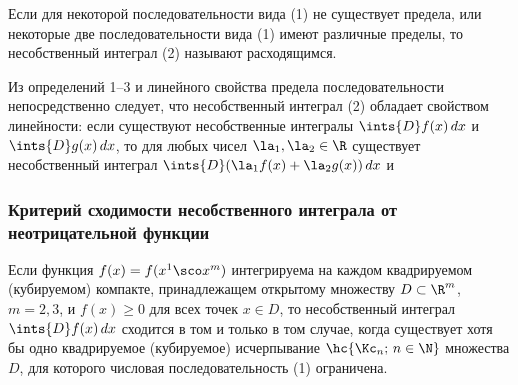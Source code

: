 \documentclass[a4paper]{article}
\begin{document}
Если для некоторой последовательности вида (1) не существует
предела, или некоторые две последовательности вида (1) имеют
различные пределы, то несобственный интеграл (2) называют
расходящимся.

Из определений 1--3 и линейного свойства предела последовательности
непосредственно следует, что несобственный интеграл (2) обладает
свойством линейности: если существуют несобственные интегралы
$\ints{D}f(x)\,dx$ и $\ints{D}g(x)\,dx$, то для любых чисел
$\la_1,\la_2\in\R$ существует несобственный интеграл $\ints{D}
(\la_1f(x)+\la_2g(x))\,dx$ и 

\subsubsection{Критерий сходимости несобственного интеграла от
неотрицательной функции}

\begin{theorem}\label{thm931}
Если функция $f(x)=f(x^1\sco x^m)$ интегрируема на каждом
квадрируемом (кубируемом) компакте, принадлежащем открытому
множеству $D\subset\R^m$, $m=2,3$, и $f(x)\ge0$ для всех точек $x\in
D$, то несобственный интеграл $\ints{D}f(x)\,dx$ сходится в том и
только в том случае, когда существует хотя бы одно квадрируемое
(кубируемое) исчерпывание $\hc{\Kc_n;\,n\in\N}$ множества $D$, для
которого числовая последовательность (1) ограничена.
\end{theorem}
\end{document}
